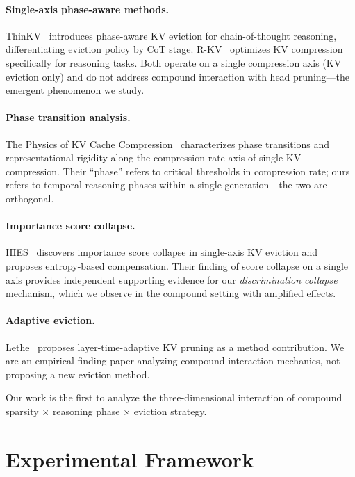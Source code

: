 \documentclass[11pt,a4paper]{article}
\begin{document}
\paragraph{Single-axis phase-aware methods.}
ThinKV~\citep{thinkv2025} introduces phase-aware KV eviction for chain-of-thought reasoning, differentiating eviction policy by CoT stage.
R-KV~\citep{rkv2025} optimizes KV compression specifically for reasoning tasks.
Both operate on a single compression axis (KV eviction only) and do not address compound interaction with head pruning---the emergent phenomenon we study.

\paragraph{Phase transition analysis.}
The Physics of KV Cache Compression~\citep{physicskv2026} characterizes phase transitions and representational rigidity along the compression-rate axis of single KV compression.
Their ``phase'' refers to critical thresholds in compression rate; ours refers to temporal reasoning phases within a single generation---the two are orthogonal.

\paragraph{Importance score collapse.}
HIES~\citep{hies2025} discovers importance score collapse in single-axis KV eviction and proposes entropy-based compensation.
Their finding of score collapse on a single axis provides independent supporting evidence for our \emph{discrimination collapse} mechanism, which we observe in the compound setting with amplified effects.

\paragraph{Adaptive eviction.}
Lethe~\citep{lethe2026} proposes layer-time-adaptive KV pruning as a method contribution.
We are an empirical finding paper analyzing compound interaction mechanics, not proposing a new eviction method.

Our work is the first to analyze the three-dimensional interaction of compound sparsity $\times$ reasoning phase $\times$ eviction strategy.

\section{Experimental Framework}
\label{sec:method}
\end{document}
